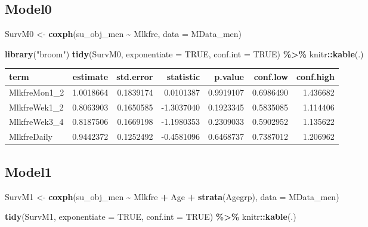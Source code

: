 \documentclass[
]{article}
\newenvironment{Shaded}{\begin{snugshade}}{\end{snugshade}}
\newcommand{\DataTypeTok}[1]{\textcolor[rgb]{0.13,0.29,0.53}{#1}}
\newcommand{\KeywordTok}[1]{\textcolor[rgb]{0.13,0.29,0.53}{\textbf{#1}}}
\newcommand{\NormalTok}[1]{#1}
\newcommand{\OperatorTok}[1]{\textcolor[rgb]{0.81,0.36,0.00}{\textbf{#1}}}
\newcommand{\OtherTok}[1]{\textcolor[rgb]{0.56,0.35,0.01}{#1}}
\newcommand{\StringTok}[1]{\textcolor[rgb]{0.31,0.60,0.02}{#1}}
\begin{document}
\hypertarget{model0-3}{%
\subsection{Model0}\label{model0-3}}

\begin{Shaded}
\begin{Highlighting}[]
\NormalTok{SurvM0 \textless{}{-}}\StringTok{  }\KeywordTok{coxph}\NormalTok{(su\_obj\_men }\OperatorTok{\textasciitilde{}}\StringTok{ }\NormalTok{Mlkfre, }
                 \DataTypeTok{data =}\NormalTok{ MData\_men)}

\KeywordTok{library}\NormalTok{(}\StringTok{"broom"}\NormalTok{)}
\KeywordTok{tidy}\NormalTok{(SurvM0, }\DataTypeTok{exponentiate =} \OtherTok{TRUE}\NormalTok{, }\DataTypeTok{conf.int =} \OtherTok{TRUE}\NormalTok{) }\OperatorTok{\%\textgreater{}\%}\StringTok{ }
\StringTok{  }\NormalTok{knitr}\OperatorTok{::}\KeywordTok{kable}\NormalTok{(.)}
\end{Highlighting}
\end{Shaded}

\begin{longtable}[]{@{}lrrrrrr@{}}
\toprule
term & estimate & std.error & statistic & p.value & conf.low &
conf.high\tabularnewline
\midrule
\endhead
MlkfreMon1\_2 & 1.0018664 & 0.1839174 & 0.0101387 & 0.9919107 &
0.6986490 & 1.436682\tabularnewline
MlkfreWek1\_2 & 0.8063903 & 0.1650585 & -1.3037040 & 0.1923345 &
0.5835085 & 1.114406\tabularnewline
MlkfreWek3\_4 & 0.8187506 & 0.1669198 & -1.1980353 & 0.2309033 &
0.5902952 & 1.135622\tabularnewline
MlkfreDaily & 0.9442372 & 0.1252492 & -0.4581096 & 0.6468737 & 0.7387012
& 1.206962\tabularnewline
\bottomrule
\end{longtable}

\hypertarget{model1-3}{%
\subsection{Model1}\label{model1-3}}

\begin{Shaded}
\begin{Highlighting}[]
\NormalTok{SurvM1 \textless{}{-}}\StringTok{  }\KeywordTok{coxph}\NormalTok{(su\_obj\_men }\OperatorTok{\textasciitilde{}}\StringTok{ }\NormalTok{Mlkfre }\OperatorTok{+}\StringTok{ }\NormalTok{Age }\OperatorTok{+}\StringTok{ }\KeywordTok{strata}\NormalTok{(Agegrp), }
                 \DataTypeTok{data =}\NormalTok{ MData\_men)}

\KeywordTok{tidy}\NormalTok{(SurvM1, }\DataTypeTok{exponentiate =} \OtherTok{TRUE}\NormalTok{, }\DataTypeTok{conf.int =} \OtherTok{TRUE}\NormalTok{) }\OperatorTok{\%\textgreater{}\%}\StringTok{ }
\StringTok{  }\NormalTok{knitr}\OperatorTok{::}\KeywordTok{kable}\NormalTok{(.)}
\end{Highlighting}
\end{Shaded}
\end{document}
